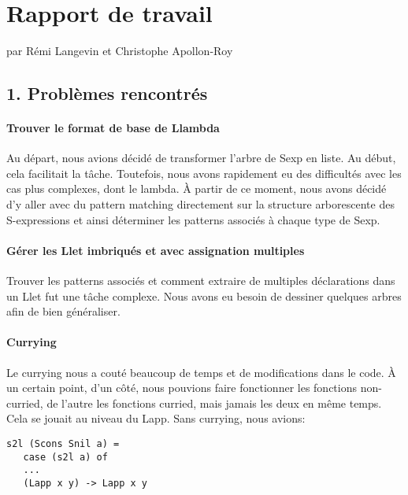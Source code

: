 \section{Rapport de travail}\label{rapport-de-travail}

par Rémi Langevin et Christophe Apollon-Roy

\subsection{1. Problèmes rencontrés}\label{probluxe8mes-rencontruxe9s}

\paragraph{Trouver le format de base de
Llambda}\label{trouver-le-format-de-base-de-llambda}

Au départ, nous avions décidé de transformer l'arbre de Sexp en liste.
Au début, cela facilitait la tâche. Toutefois, nous avons rapidement eu
des difficultés avec les cas plus complexes, dont le lambda. À partir de
ce moment, nous avons décidé d'y aller avec du pattern matching
directement sur la structure arborescente des S-expressions et ainsi
déterminer les patterns associés à chaque type de Sexp.

\paragraph{Gérer les Llet imbriqués et avec assignation
multiples}\label{guxe9rer-les-llet-imbriquuxe9s-et-avec-assignation-multiples}

Trouver les patterns associés et comment extraire de multiples
déclarations dans un Llet fut une tâche complexe. Nous avons eu besoin
de dessiner quelques arbres afin de bien généraliser.

\paragraph{Currying}\label{currying}

Le currying nous a couté beaucoup de temps et de modifications dans le
code. À un certain point, d'un côté, nous pouvions faire fonctionner les
fonctions non-curried, de l'autre les fonctions curried, mais jamais les
deux en même temps. Cela se jouait au niveau du Lapp. Sans currying,
nous avions:

\begin{verbatim}
s2l (Scons Snil a) =
   case (s2l a) of
   ...
   (Lapp x y) -> Lapp x y
\end{verbatim}

